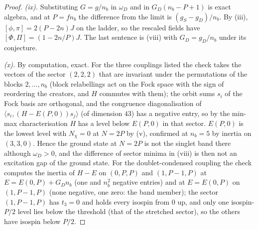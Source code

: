 \begin{proof}
\emph{(ix).} Substituting $G = g/n_{b}$ in $\omega_{D}$ and in $G_{D}(n_{b} - P + 1)$ is exact algebra, and at $P = fn_{b}$ the difference from the limit is $(g_{S} - g_{D})/n_{b}$. By (iii), $[\phi, \pi] = 2(P - 2n)J$ on the ladder, so the rescaled fields have $[\Phi, \Pi] = (1 - 2n/P)J$. The last sentence is (viii) with $G_{D} = g_{D}/n_{b}$ under its conjecture.

\emph{(x).} By computation, exact. For the three couplings listed the check takes the vectors of the sector $(2, 2, 2)$ that are invariant under the permutations of the blocks $2, \ldots, n_{b}$ (block relabellings act on the Fock space with the sign of reordering the creators, and $H$ commutes with them); the orbit sums $s_{i}$ of the Fock basis are orthogonal, and the congruence diagonalisation of $\langle s_{i}, (H - E(P, 0))s_{j}\rangle$ (of dimension $43$) has a negative entry, so by the min-max characterisation $H$ has a level below $E(P, 0)$ in that sector. $E(P, 0)$ is the lowest level with $N_{\chi} = 0$ at $N = 2P$ by (v), confirmed at $n_{b} = 5$ by inertia on $(3, 3, 0)$. Hence the ground state at $N = 2P$ is not the singlet band there although $\omega_{D} > 0$, and the difference of sector minima in (viii) is then not an excitation gap of the ground state. For the doublet-condensed coupling the check computes the inertia of $H - E$ on $(0, P, P)$ and $(1, P - 1, P)$ at $E = E(0, P) + G_{D}n_{b}$ (one and $n_{b}^{2}$ negative entries) and at $E = E(0, P)$ on $(1, P - 1, P)$ (none negative, one zero: the band member); the sector $(1, P - 1, P)$ has $t_{3} = 0$ and holds every isospin from $0$ up, and only one isospin-$P/2$ level lies below the threshold (that of the stretched sector), so the others have isospin below $P/2$.


\end{proof}
